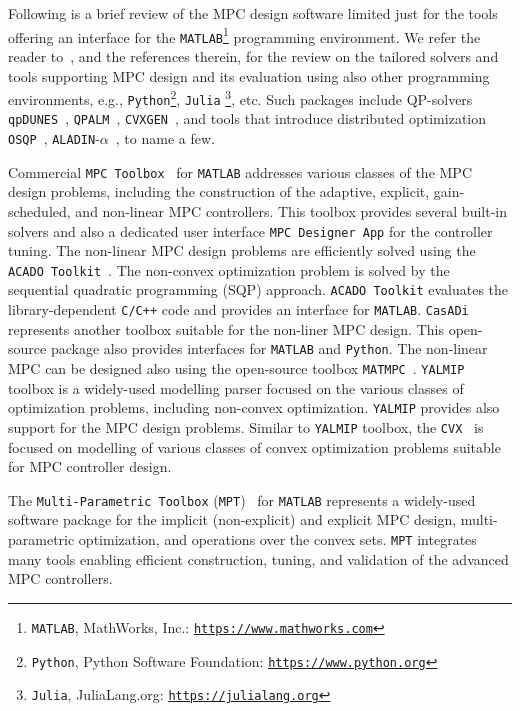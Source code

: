 \documentclass[letterpaper, 10 pt, conference]{ieeeconf}
\begin{document}
Following is a brief review of the MPC design software limited just for the tools offering an interface for the \texttt{MATLAB}\footnote{\texttt{MATLAB}, MathWorks, Inc.: \texttt{\url{https://www.mathworks.com}}} programming environment. We refer the reader to~\cite{KF18,LT17,HS22}, 
and the references therein, for the review on the tailored solvers and tools supporting MPC design and its evaluation using also other programming environments, e.g., \texttt{Python}\footnote{\texttt{Python}, Python Software Foundation: \texttt{\url{https://www.python.org}}}, \texttt{Julia} \footnote{\texttt{Julia}, JuliaLang.org: \texttt{\url{https://julialang.org}}}, etc. Such packages include QP-solvers \texttt{qpDUNES}~\cite{qpDUNES}, \texttt{QPALM}~\cite{QPALM}, \texttt{CVXGEN}~\cite{CVXGEN}, and tools that introduce distributed optimization \texttt{OSQP}~\cite{OSQP}, \texttt{ALADIN}-$\alpha$~\cite{EJ21}, to name a few. 

Commercial \texttt{MPC Toolbox}~\cite{MPC_toolbox} for \texttt{MATLAB} addresses various classes of the MPC design problems, including the construction of the adaptive, explicit, gain-scheduled, and non-linear MPC controllers. This toolbox provides several built-in solvers and also a dedicated user interface \texttt{MPC Designer App} for the controller tuning. 
%
The non-linear MPC design problems are efficiently solved using the \texttt{ACADO Toolkit}~\cite{ACADO_Toolkit}. The non-convex optimization problem is solved by the sequential quadratic programming (SQP) approach.  \texttt{ACADO Toolkit} evaluates the library-dependent \texttt{C/C++} code and provides an interface for \texttt{MATLAB}. 
%
\texttt{CasADi}~\cite{CasADi} represents another toolbox suitable for the non-liner MPC design. This open-source package also provides interfaces for \texttt{MATLAB} and \texttt{Python}. 
%
The non-linear MPC can be designed also using the open-source toolbox \texttt{MATMPC}~\cite{MATMPC}. 
%
\texttt{YALMIP}~\cite{L04} toolbox is a widely-used modelling parser focused on the various classes of optimization problems, including non-convex optimization. \texttt{YALMIP} provides also support for the MPC design problems. 
%
Similar to \texttt{YALMIP} toolbox, the \texttt{CVX}~\cite{GB08} is focused on modelling of various classes of convex optimization problems suitable for MPC controller design. 

The \texttt{Multi-Parametric Toolbox} (\texttt{MPT})~\cite{MPT3} for \texttt{MATLAB} represents a widely-used software package for the implicit (non-explicit) and explicit MPC design, multi-parametric optimization, and operations over the convex sets. \texttt{MPT} integrates many tools enabling efficient construction, tuning, and validation of the advanced MPC controllers. 
\end{document}

